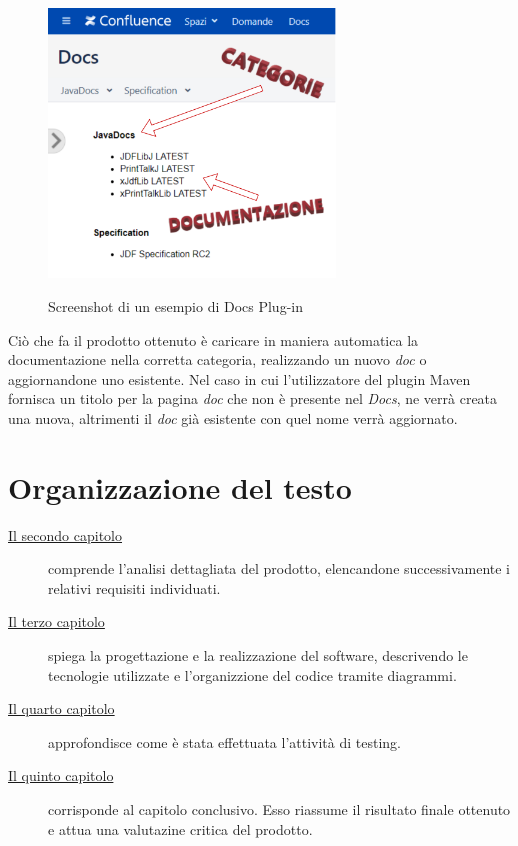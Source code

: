 \begin{figure}[H]
    \centering
    \includegraphics[width=0.68\textwidth]{immagini/docs-conf.png}\\
    \caption{Screenshot di un esempio di Docs Plug-in}
\end{figure}

Ciò che fa il prodotto ottenuto è caricare in maniera automatica la documentazione nella corretta categoria, realizzando un nuovo \emph{doc} o aggiornandone uno esistente.
Nel caso in cui l'utilizzatore del plugin Maven fornisca un titolo per la pagina \emph{doc} che non è presente nel \emph{Docs}, ne verrà creata una nuova, altrimenti il \emph{doc} già esistente con quel nome verrà aggiornato.

\section{Organizzazione del testo}

\begin{description}
    \item[{\hyperref[cap:analisi-requisiti]{Il secondo capitolo}}] comprende l'analisi dettagliata del prodotto, elencandone successivamente i relativi requisiti individuati.

    \item[{\hyperref[cap:progettazione]{Il terzo capitolo}}] spiega la progettazione e la realizzazione del software, descrivendo le tecnologie utilizzate e l'organizzione del codice tramite diagrammi.

    \item[{\hyperref[cap:testing]{Il quarto capitolo}}] approfondisce come è stata effettuata l'attività di testing.

    \item[{\hyperref[cap:conclusioni]{Il quinto capitolo}}] corrisponde al capitolo conclusivo. Esso riassume il risultato finale ottenuto e attua una valutazine critica del prodotto.

\end{description}

